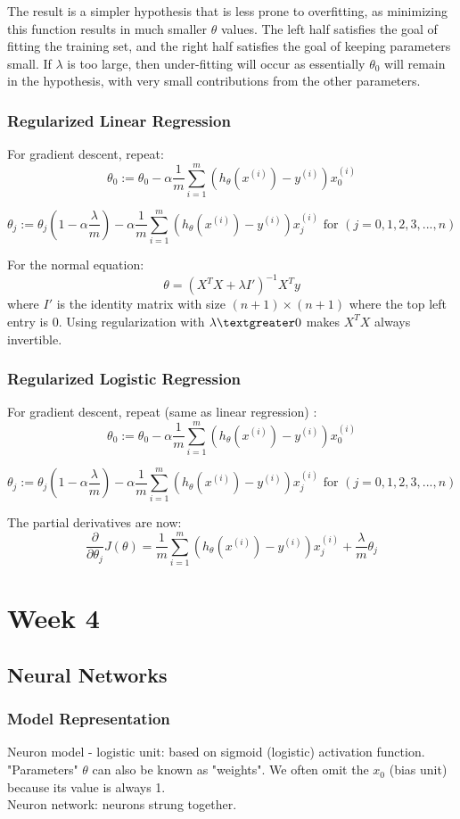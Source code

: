 \documentclass[11pt,letterpaper]{article}
\begin{document}
The result is a simpler hypothesis that is less prone to overfitting, as minimizing this function results in much smaller $\theta$ values. The left half satisfies the goal of fitting the training set, and the right half satisfies the goal of keeping parameters small. If $\lambda$ is too large, then under-fitting will occur as essentially $\theta_0$ will remain in the hypothesis, with very small contributions from the other parameters.

\subsubsection{Regularized Linear Regression}
For gradient descent, repeat:
$$ \theta_0 := \theta_0 - \alpha \frac{1}{m}\sum_{i=1}^{m}(h_\theta( x^{(i)})-y^{(i)})x_0^{(i)} $$

$$ \theta_j := \theta_j(1-\alpha \frac{\lambda}{m}) - \alpha \frac{1}{m}\sum_{i=1}^{m}(h_\theta( x^{(i)})-y^{(i)}) x_j^{(i)} \textrm{ for } (j=0,1,2,3,...,n)$$

For the normal equation:
$$\theta = (X^TX + \lambda I')^{-1}X^Ty $$ where $I'$ is the identity matrix with size $(n+1) \times (n+1)$ where the top left entry is 0. Using regularization with $\lambda \textgreater 0$ makes $X^TX$ always invertible.

\subsubsection{Regularized Logistic Regression}
For gradient descent, repeat (same as linear regression) :
$$ \theta_0 := \theta_0 - \alpha \frac{1}{m}\sum_{i=1}^{m}(h_\theta( x^{(i)})-y^{(i)})x_0^{(i)} $$

$$ \theta_j := \theta_j(1-\alpha \frac{\lambda}{m}) - \alpha \frac{1}{m}\sum_{i=1}^{m}(h_\theta( x^{(i)})-y^{(i)}) x_j^{(i)} \textrm{ for } (j=0,1,2,3,...,n)$$
 
The partial derivatives are now:
$$ \frac{\partial}{\partial \theta_j}J(\theta) = \frac{1}{m}\sum_{i=1}^{m}(h_\theta( x^{(i)})-y^{(i)})x_j^{(i)} + \frac{\lambda}{m	}\theta_j $$

\section{Week 4}
\subsection{Neural Networks}
\subsubsection{Model Representation}
Neuron model - logistic unit: based on sigmoid (logistic) activation function. "Parameters" $\theta$ can also be known as "weights". We often omit the $x_0$ (bias unit) because its value is always 1.\\
Neuron network: neurons strung together. 
\end{document}
